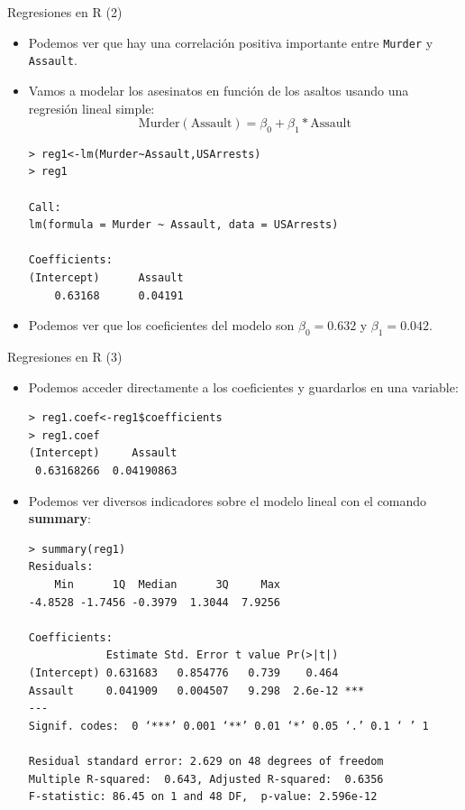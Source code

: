 \documentclass[handout]{beamer}
\begin{document}
\begin{frame}[fragile]{Regresiones en R (2)}
\scriptsize{
\begin{itemize}
 \item Podemos ver que hay una correlación positiva importante entre \verb+Murder+ y \verb+Assault+.
 \item Vamos a modelar los asesinatos en función de los asaltos usando una regresión lineal simple:
 \begin{displaymath}
  \text{Murder}(\text{Assault})=\beta_0+\beta_1*\text{Assault}
 \end{displaymath}
 \begin{verbatim}
> reg1<-lm(Murder~Assault,USArrests)
> reg1

Call:
lm(formula = Murder ~ Assault, data = USArrests)

Coefficients:
(Intercept)      Assault  
    0.63168      0.04191    
 \end{verbatim}
 
 \item Podemos ver que los coeficientes del modelo son $\beta_{0}=0.632$ y $\beta_{1}=0.042$. 
 
 


\end{itemize}
 
 
 
} 
\end{frame}

\begin{frame}[fragile]{Regresiones en R (3)}
\scriptsize{
\begin{itemize}
 \item Podemos acceder directamente a los coeficientes y guardarlos en una variable:
 \begin{verbatim}
> reg1.coef<-reg1$coefficients
> reg1.coef
(Intercept)     Assault 
 0.63168266  0.04190863 
 \end{verbatim}
 
\item Podemos ver diversos indicadores sobre el modelo lineal con el comando \textbf{summary}:
 
\begin{verbatim}
> summary(reg1)
Residuals:
    Min      1Q  Median      3Q     Max 
-4.8528 -1.7456 -0.3979  1.3044  7.9256 

Coefficients:
            Estimate Std. Error t value Pr(>|t|)    
(Intercept) 0.631683   0.854776   0.739    0.464    
Assault     0.041909   0.004507   9.298  2.6e-12 ***
---
Signif. codes:  0 ‘***’ 0.001 ‘**’ 0.01 ‘*’ 0.05 ‘.’ 0.1 ‘ ’ 1

Residual standard error: 2.629 on 48 degrees of freedom
Multiple R-squared:  0.643,	Adjusted R-squared:  0.6356 
F-statistic: 86.45 on 1 and 48 DF,  p-value: 2.596e-12

\end{verbatim}
 
 \end{itemize}
 
 


} 
\end{frame}
\end{document}
